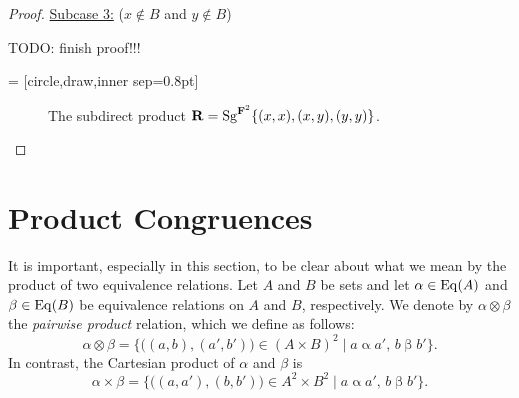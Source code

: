 \begin{proof}
\noindent \underline{Subcase 3:} ($x\notin B$ and $y\notin B$)\\[5pt]
\vskip1cm

\noindent TODO: finish proof!!!

   = [circle,draw,inner sep=0.8pt]
  \begin{center}
  \begin{figure}
    \caption{The subdirect product $\mathbf R = \operatorname{Sg}^{\mathbf{F}^2}\{(x,x), (x,y), (y,y)\}$.}
  \end{figure}
  \end{center}
\bigskip


\vfill

\end{proof}
\newpage


\appendix

\section{Product Congruences}
It is important, especially in this section, to be clear about what we mean
by the product of two equivalence relations.
Let $A$ and $B$ be sets and let $\alpha \in \operatorname{Eq}(A)$ and $\beta \in \operatorname{Eq}(B)$
be equivalence relations on $A$ and $B$, respectively.
We denote by $\alpha \otimes \beta$ the \emph{pairwise product} relation,
which we define as follows:
\begin{equation}
\label{eq:pair-product}
\alpha \otimes \beta = \{\bigl((a, b), (a', b')\bigr) 
\in (A\times B)^2 \mid a\mathrel{\alpha} a', \, b\mathrel{\beta} b'\}.
\end{equation}
In contrast, the Cartesian product of $\alpha$ and $\beta$ is 
\begin{equation}
\label{eq:set-product}
\alpha \times \beta = \{\bigl((a, a'), (b, b')\bigr) 
\in A^2\times B^2 \mid a\mathrel{\alpha} a', \, b\mathrel{\beta} b'\}.
\end{equation}


